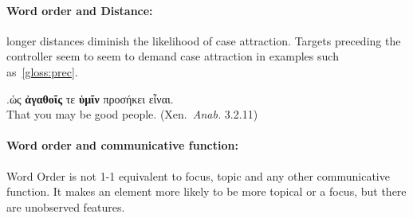 \documentclass[a4paper, 12pt, article]{memoir}
\begin{document}


\paragraph{Word order and Distance:} longer distances diminish the likelihood of
case attraction. Targets preceding the controller seem to
seem to demand case attraction in examples such as~\ref{gloss:prec}.

\ex.\label{gloss:prec}ὡς \textbf{ἀγαθοῖς} τε \textbf{ὑμῖν} προσήκει εἶναι.\\
That you may be good people. (Xen.\ \emph{Anab.} 3.2.11)


%
\paragraph{Word order and communicative function:} Word Order is not 1-1
equivalent to focus, topic and any other communicative function. It makes an
element more likely to be more topical or a focus, but there are unobserved
features.%

\end{document}
